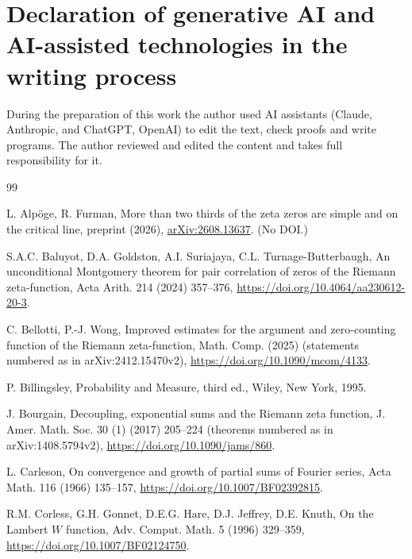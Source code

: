 \documentclass[preprint,12pt]{elsarticle}
\numberwithin{equation}{section}
\theoremstyle{plain}
\theoremstyle{definition}
\theoremstyle{remark}
\begin{document}
\section*{Declaration of generative AI and AI-assisted technologies in the writing process}
During the preparation of this work the author used AI assistants (Claude, Anthropic, and ChatGPT, OpenAI) to edit the text, check proofs and write programs. The author reviewed and edited the content and takes full responsibility for it.


\begin{thebibliography}{99}

L. Alp\"oge, R. Furman, More than two thirds of the zeta zeros are simple and on the critical line, preprint (2026), \href{https://arxiv.org/abs/2608.13637}{arXiv:2608.13637}. (No DOI.)

S.A.C. Baluyot, D.A. Goldston, A.I. Suriajaya, C.L. Turnage-Butterbaugh, An unconditional Montgomery theorem for pair correlation of zeros of the Riemann zeta-function, Acta Arith. 214 (2024) 357--376, \href{https://doi.org/10.4064/aa230612-20-3}{https://doi.org/10.4064/aa230612-20-3}.

C. Bellotti, P.-J. Wong, Improved estimates for the argument and zero-counting function of the Riemann zeta-function, Math. Comp. (2025) (statements numbered as in arXiv:2412.15470v2), \href{https://doi.org/10.1090/mcom/4133}{https://doi.org/10.1090/mcom/4133}.

P. Billingsley, Probability and Measure, third ed., Wiley, New York, 1995.

J. Bourgain, Decoupling, exponential sums and the Riemann zeta function, J. Amer. Math. Soc. 30 (1) (2017) 205--224 (theorems numbered as in arXiv:1408.5794v2), \href{https://doi.org/10.1090/jams/860}{https://doi.org/10.1090/jams/860}.

L. Carleson, On convergence and growth of partial sums of Fourier series, Acta Math. 116 (1966) 135--157, \href{https://doi.org/10.1007/BF02392815}{https://doi.org/10.1007/BF02392815}.

R.M. Corless, G.H. Gonnet, D.E.G. Hare, D.J. Jeffrey, D.E. Knuth, On the Lambert $W$ function, Adv. Comput. Math. 5 (1996) 329--359, \href{https://doi.org/10.1007/BF02124750}{https://doi.org/10.1007/BF02124750}.


\end{thebibliography}
\end{document}
